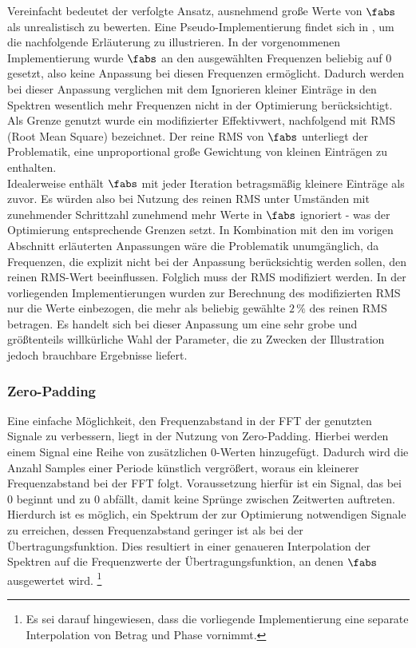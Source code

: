\documentclass[../Report.tex]{subfiles}
\begin{document}
Vereinfacht bedeutet der verfolgte Ansatz, ausnehmend große Werte von $\fabs$ als unrealistisch zu bewerten. Eine Pseudo-Implementierung findet sich in , um die nachfolgende Erläuterung zu illustrieren. In der vorgenommenen Implementierung wurde $\fabs$ an den ausgewählten Frequenzen beliebig auf $0$ gesetzt, also keine Anpassung bei diesen Frequenzen ermöglicht.
Dadurch werden bei dieser Anpassung verglichen mit dem Ignorieren kleiner Einträge in den Spektren wesentlich mehr Frequenzen nicht in der Optimierung berücksichtigt.
\\
Als Grenze genutzt wurde ein modifizierter Effektivwert, nachfolgend mit RMS (Root Mean Square) bezeichnet. 
Der reine RMS von $\fabs$ unterliegt der Problematik, eine unproportional große Gewichtung von kleinen Einträgen zu enthalten.
\\
Idealerweise enthält $\fabs$ mit jeder Iteration betragsmäßig kleinere Einträge als zuvor. Es würden also bei Nutzung des reinen RMS unter Umständen mit zunehmender Schrittzahl zunehmend mehr Werte in $\fabs$ ignoriert - was der Optimierung entsprechende Grenzen setzt. 
In Kombination mit den im vorigen Abschnitt erläuterten Anpassungen wäre die Problematik unumgänglich, da Frequenzen, die explizit nicht bei der Anpassung berücksichtig werden sollen, den reinen RMS-Wert beeinflussen.
Folglich muss der RMS modifiziert werden. In der vorliegenden Implementierungen wurden zur Berechnung des modifizierten RMS nur die Werte einbezogen, die mehr als beliebig gewählte $2 \, \%$ des reinen RMS betragen. Es handelt sich bei dieser Anpassung um eine sehr grobe und größtenteils willkürliche Wahl der Parameter, die zu Zwecken der Illustration jedoch brauchbare Ergebnisse liefert.

\subsubsection*{Zero-Padding}
\label{subsubsec:opt.H.zeropadd}

Eine einfache Möglichkeit, den Frequenzabstand in der FFT der genutzten Signale zu verbessern, liegt in der Nutzung von Zero-Padding. Hierbei werden einem Signal eine Reihe von zusätzlichen 0-Werten hinzugefügt. Dadurch wird die Anzahl Samples einer Periode künstlich vergrößert, woraus ein kleinerer Frequenzabstand bei der FFT folgt. Voraussetzung hierfür ist ein Signal, das bei 0 beginnt und zu 0 abfällt, damit keine Sprünge zwischen Zeitwerten auftreten.
Hierdurch ist es möglich, ein Spektrum der zur Optimierung notwendigen Signale zu erreichen, dessen Frequenzabstand geringer ist als bei der Übertragungsfunktion.
Dies resultiert in einer genaueren Interpolation der Spektren auf die Frequenzwerte der Übertragungsfunktion, an denen $\fabs$ ausgewertet wird.
\footnote{Es sei darauf hingewiesen, dass die vorliegende Implementierung eine separate Interpolation von Betrag und Phase vornimmt.}
\end{document}
